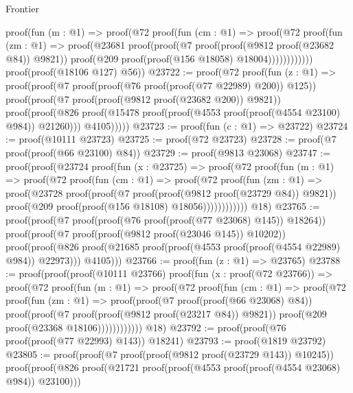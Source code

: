 \begin{lexlean}{Frontier}
\begin{coremodule}
              proof(fun (m : @1) =>
                proof(@72
                    proof(fun (cm : @1) =>
                      proof(@72
                          proof(fun (zm : @1) =>
                            proof(@23681
                                proof(proof(@7 proof(proof(@9812 proof(@23682 @84)) @9821))
                                    proof(@209 proof(proof(@156 @18058) @18004))))))))))))
      proof(proof(@18106 @127) @56))
@23722 := proof(@72
      proof(fun (z : @1) =>
        proof(proof(@7 proof(proof(@76 proof(proof(@77 @22989) @200)) @125))
            proof(proof(@7 proof(proof(@9812 proof(@23682 @200)) @9821))
                proof(proof(@826
                      proof(@15478 proof(proof(@4553 proof(proof(@4554 @23100) @984)) @21260)))
                    @4105)))))
@23723 := proof(fun (c : @1) => @23722)
@23724 := proof(@10111 @23723)
@23725 := proof(@72 @23723)
@23728 := proof(@7 proof(proof(@66 @23100) @84))
@23729 := proof(@9813 @23068)
@23747 := proof(proof(@23724
        proof(fun (x : @23725) =>
          proof(@72
              proof(fun (m : @1) =>
                proof(@72
                    proof(fun (cm : @1) =>
                      proof(@72
                          proof(fun (zm : @1) =>
                            proof(@23728
                                proof(proof(@7 proof(proof(@9812 proof(@23729 @84)) @9821))
                                    proof(@209 proof(proof(@156 @18108) @18056))))))))))))
      @18)
@23765 := proof(proof(@7 proof(proof(@76 proof(proof(@77 @23068) @145)) @18264))
      proof(proof(@7 proof(proof(@9812 proof(@23046 @145)) @10202))
          proof(proof(@826 proof(@21685 proof(proof(@4553 proof(proof(@4554 @22989) @984)) @22973)))
              @4105)))
@23766 := proof(fun (z : @1) => @23765)
@23788 := proof(proof(proof(@10111 @23766)
        proof(fun (x : proof(@72 @23766)) =>
          proof(@72
              proof(fun (m : @1) =>
                proof(@72
                    proof(fun (cm : @1) =>
                      proof(@72
                          proof(fun (zm : @1) =>
                            proof(proof(@7 proof(proof(@66 @23068) @84))
                                proof(proof(@7 proof(proof(@9812 proof(@23217 @84)) @9821))
                                    proof(@209 proof(@23368 @18106))))))))))))
      @18)
@23792 := proof(proof(@76 proof(proof(@77 @22993) @143)) @18241)
@23793 := proof(@1819 @23792)
@23805 := proof(proof(@7 proof(proof(@9812 proof(@23729 @143)) @10245))
      proof(proof(@826 proof(@21721 proof(proof(@4553 proof(proof(@4554 @23068) @984)) @23100)))

\end{coremodule}
\end{lexlean}
